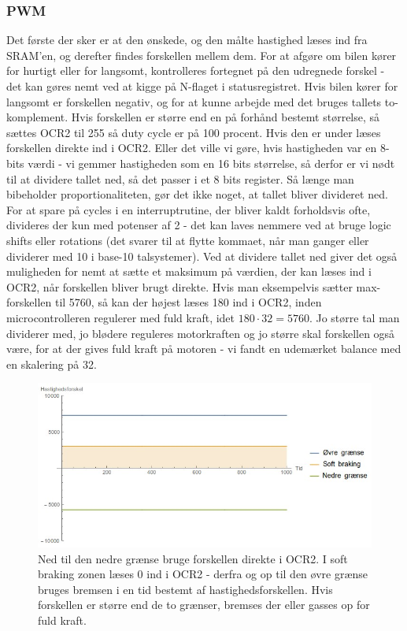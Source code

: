 \subsubsection{PWM}
Det første der sker er at den ønskede, og den målte hastighed læses ind fra SRAM'en, og derefter findes forskellen mellem dem. For at afgøre om bilen kører for hurtigt eller for langsomt, kontrolleres fortegnet på den udregnede forskel - det kan gøres nemt ved at kigge på N-flaget i statusregistret. Hvis bilen kører for langsomt er forskellen negativ, og for at kunne arbejde med det bruges tallets to-komplement. Hvis forskellen er større end en på forhånd bestemt størrelse, så sættes OCR2 til 255 så duty cycle er på 100 procent. Hvis den er under læses forskellen direkte ind i OCR2. Eller det ville vi gøre, hvis hastigheden var en 8-bits værdi - vi gemmer hastigheden som en 16 bits størrelse, så derfor er vi nødt til at dividere tallet ned, så det passer i et 8 bits register. Så længe man bibeholder proportionaliteten, gør det ikke noget, at tallet bliver divideret ned. For at spare på cycles i en interruptrutine, der bliver kaldt forholdsvis ofte, divideres der kun med potenser af 2 - det kan laves nemmere ved at bruge logic shifts eller rotations (det svarer til at flytte kommaet, når man ganger eller dividerer med 10 i base-10 talsystemer). Ved at dividere tallet ned giver det også muligheden for nemt at sætte et maksimum på værdien, der kan læses ind i OCR2, når forskellen bliver brugt direkte. Hvis man eksempelvis sætter max-forskellen til 5760, så kan der højest læses 180 ind i OCR2, inden microcontrolleren regulerer med fuld kraft, idet $180 \cdot 32 = 5760$. Jo større tal man dividerer med, jo blødere reguleres motorkraften og jo større skal forskellen også være, for at der gives fuld kraft på motoren - vi fandt en udemærket balance med en skalering på 32.\\


\begin{figure}[h]

	\centering
		\includegraphics[scale=0.4]{Billeder/Braking.jpg}
	\caption{Ned til den nedre grænse bruge forskellen direkte i OCR2. I soft braking zonen læses 0 ind i OCR2 - derfra og op til den øvre grænse bruges bremsen i en tid bestemt af hastighedsforskellen. Hvis forskellen er større end de to grænser, bremses der eller gasses op for fuld kraft.}
	\label{fig:Forgiveness}
\end{figure}

